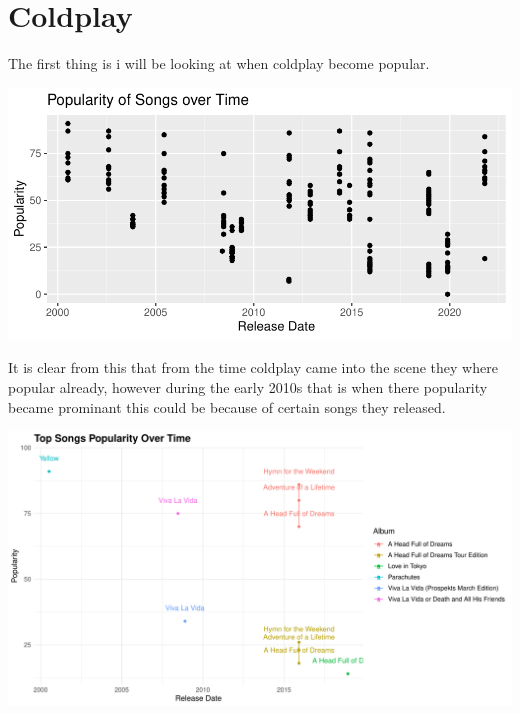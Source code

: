 \documentclass[12pt,preprint, authoryear]{elsarticle}
\let\origfigure\figure
\let\endorigfigure\endfigure
\renewenvironment{figure}[1][2] {
    \expandafter\origfigure\expandafter[H]
} {
    \endorigfigure
}
\numberwithin{equation}{section}
\numberwithin{figure}{section}
\numberwithin{table}{section}
\begin{document}
\hypertarget{coldplay}{%
\section*{Coldplay}\label{coldplay}}

The first thing is i will be looking at when coldplay become popular.

\begin{figure}[H]

{\centering \includegraphics{Q3_files/figure-latex/Figure1-1} 

}

\caption{Popularity of Songs \label{Figure1}}\label{fig:Figure1}
\end{figure}

It is clear from this that from the time coldplay came into the scene
they where popular already, however during the early 2010s that is when
there popularity became prominant this could be because of certain songs
they released.

\begin{figure}[H]

{\centering \includegraphics{Q3_files/figure-latex/Figure2-1} 

}

\caption{Songs over time  \label{Figure2}}\label{fig:Figure2}
\end{figure}
\end{document}
